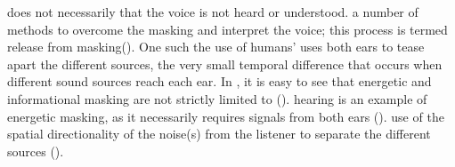 \DIFdelbegin {}\DIFdelend \DIFaddbegin {}\DIFaddend does not necessarily \DIFdelbegin {}\DIFdelend \DIFaddbegin {}\DIFaddend that the voice is not heard or understood.  \DIFdelbegin {}\DIFdelend \DIFaddbegin {}\DIFaddend a number of methods \DIFdelbegin {}\DIFdelend to overcome the masking and interpret the voice; this process is termed \DIFdelbegin {}\DIFdelend \DIFaddbegin {}\DIFaddend release from masking\DIFdelbegin {}\DIFdelend \DIFaddbegin {}\DIFaddend (\cite{middlebrooks:17}).  One such \DIFdelbegin {}\DIFdelend \DIFaddbegin {}\DIFaddend the use of humans' \DIFdelbegin {}\DIFdelend \DIFaddbegin {}\DIFaddend uses both ears to tease apart the different sources, \DIFdelbegin {}\DIFdelend \DIFaddbegin {}\DIFaddend the very small temporal difference that occurs when different sound sources reach each ear.  
In \DIFdelbegin {}\DIFdelend \DIFaddbegin {}\DIFaddend , it is easy to see that energetic and informational masking are not strictly limited to \DIFdelbegin {}\DIFdelend \DIFaddbegin {}\DIFaddend (\cite{durlach:06}).
\DIFdelbegin {}\DIFdelend \DIFaddbegin {}\DIFaddend hearing is an example of \DIFdelbegin {}\DIFdelend \DIFaddbegin {}\DIFaddend energetic masking, as it necessarily requires signals from both ears \DIFdelbegin {}\DIFdelend \DIFaddbegin {}\DIFaddend (\cite{hirsh:48}). \DIFdelbegin {}\DIFdelend \DIFaddbegin {}\DIFaddend use of the spatial directionality of the noise(s) from the listener to separate the different sources (\cite{bregman:94}).

